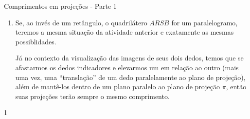 \begin{answer}{Comprimentos em projeções - Parte 1}
{\begin{enumerate}
\begin{itemize}
\item {} 
Se \(x<d\), ou seja, \(RS\) está posicionado antes do plano de projeção, então \(R'S'\) terá comprimento maior que \(AB\) e \(RS\).

\end{itemize}
No contexto da visualização das imagens de seus dois dedos, temos que se afastarmos os dedos indicadores e mantivermos os dois em um plano paralelo ao plano de projeção \(\pi\) (“translação” de um dos dedos paralelamente ao plano de projeção), então suas projeções terão sempre o mesmo comprimento.

\item {} 
Se, ao invés de um retângulo, o quadrilátero \(ARSB\) for um paralelogramo, teremos a mesma situação da atividade anterior e exatamente as mesmas possiblidades.

Já no contexto da visualização das imagens de seus dois dedos, temos que se afastarmos os dedos indicadores e elevarmos um em relação ao outro (mais uma vez, uma “translação” de um dedo paralelamente ao plano de projeção), além de  mantê-los dentro de um plano paralelo ao plano de projeção \(\pi\), então suas projeções terão sempre o mesmo comprimento.
\end{enumerate}
}{1}
\end{answer}
